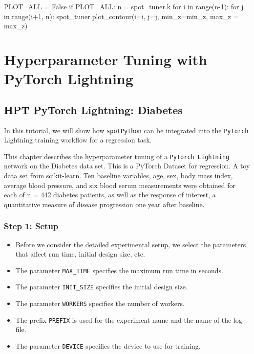 \documentclass[
  letterpaper,
  DIV=11,
  numbers=noendperiod]{scrreprt}
\newenvironment{Shaded}{\begin{snugshade}}{\end{snugshade}}
\newcommand{\BuiltInTok}[1]{\textcolor[rgb]{0.00,0.23,0.31}{#1}}
\newcommand{\ControlFlowTok}[1]{\textcolor[rgb]{0.00,0.23,0.31}{#1}}
\newcommand{\DecValTok}[1]{\textcolor[rgb]{0.68,0.00,0.00}{#1}}
\newcommand{\KeywordTok}[1]{\textcolor[rgb]{0.00,0.23,0.31}{#1}}
\newcommand{\NormalTok}[1]{\textcolor[rgb]{0.00,0.23,0.31}{#1}}
\newcommand{\OperatorTok}[1]{\textcolor[rgb]{0.37,0.37,0.37}{#1}}
\newcommand{\VariableTok}[1]{\textcolor[rgb]{0.07,0.07,0.07}{#1}}
\providecommand{\tightlist}{%
  \setlength{\itemsep}{0pt}\setlength{\parskip}{0pt}}\usepackage{longtable,booktabs,array}
\begin{document}
\begin{Shaded}
\begin{Highlighting}[]
\NormalTok{PLOT\_ALL }\OperatorTok{=} \VariableTok{False}
\ControlFlowTok{if}\NormalTok{ PLOT\_ALL:}
\NormalTok{    n }\OperatorTok{=}\NormalTok{ spot\_tuner.k}
    \ControlFlowTok{for}\NormalTok{ i }\KeywordTok{in} \BuiltInTok{range}\NormalTok{(n}\OperatorTok{{-}}\DecValTok{1}\NormalTok{):}
        \ControlFlowTok{for}\NormalTok{ j }\KeywordTok{in} \BuiltInTok{range}\NormalTok{(i}\OperatorTok{+}\DecValTok{1}\NormalTok{, n):}
\NormalTok{            spot\_tuner.plot\_contour(i}\OperatorTok{=}\NormalTok{i, j}\OperatorTok{=}\NormalTok{j, min\_z}\OperatorTok{=}\NormalTok{min\_z, max\_z }\OperatorTok{=}\NormalTok{ max\_z)}
\end{Highlighting}
\end{Shaded}

\part{Hyperparameter Tuning with PyTorch Lightning}

\chapter{HPT PyTorch Lightning:
Diabetes}\label{hpt-pytorch-lightning-diabetes}

In this tutorial, we will show how \texttt{spotPython} can be integrated
into the \texttt{PyTorch} Lightning training workflow for a regression
task.

This chapter describes the hyperparameter tuning of a
\texttt{PyTorch\ Lightning} network on the Diabetes data set. This is a
PyTorch Dataset for regression. A toy data set from scikit-learn. Ten
baseline variables, age, sex, body mass index, average blood pressure,
and six blood serum measurements were obtained for each of n = 442
diabetes patients, as well as the response of interest, a quantitative
measure of disease progression one year after baseline.

\section{Step 1: Setup}\label{sec-setup-31}

\begin{itemize}
\tightlist
\item
  Before we consider the detailed experimental setup, we select the
  parameters that affect run time, initial design size, etc.
\item
  The parameter \texttt{MAX\_TIME} specifies the maximum run time in
  seconds.
\item
  The parameter \texttt{INIT\_SIZE} specifies the initial design size.
\item
  The parameter \texttt{WORKERS} specifies the number of workers.
\item
  The prefix \texttt{PREFIX} is used for the experiment name and the
  name of the log file.
\item
  The parameter \texttt{DEVICE} specifies the device to use for
  training.
\end{itemize}
\end{document}
